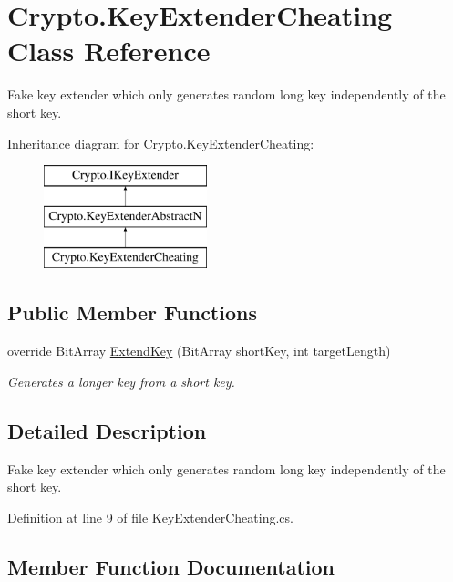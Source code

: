\hypertarget{class_crypto_1_1_key_extender_cheating}{}\section{Crypto.\+Key\+Extender\+Cheating Class Reference}
\label{class_crypto_1_1_key_extender_cheating}


Fake key extender which only generates random long key independently of the short key.  


Inheritance diagram for Crypto.\+Key\+Extender\+Cheating\+:\begin{figure}[H]
\begin{center}
\leavevmode
\includegraphics[height=3.000000cm]{class_crypto_1_1_key_extender_cheating}
\end{center}
\end{figure}
\subsection*{Public Member Functions}
\begin{DoxyCompactItemize}
\item 
override Bit\+Array \hyperlink{class_crypto_1_1_key_extender_cheating_a8018900fc6f660f83cb7cd23d52b60a3}{Extend\+Key} (Bit\+Array short\+Key, int target\+Length)
\begin{DoxyCompactList}\small\item\em Generates a longer key from a short key. \end{DoxyCompactList}\end{DoxyCompactItemize}


\subsection{Detailed Description}
Fake key extender which only generates random long key independently of the short key. 



Definition at line 9 of file Key\+Extender\+Cheating.\+cs.



\subsection{Member Function Documentation}
\hypertarget{class_crypto_1_1_key_extender_cheating_a8018900fc6f660f83cb7cd23d52b60a3}{}
